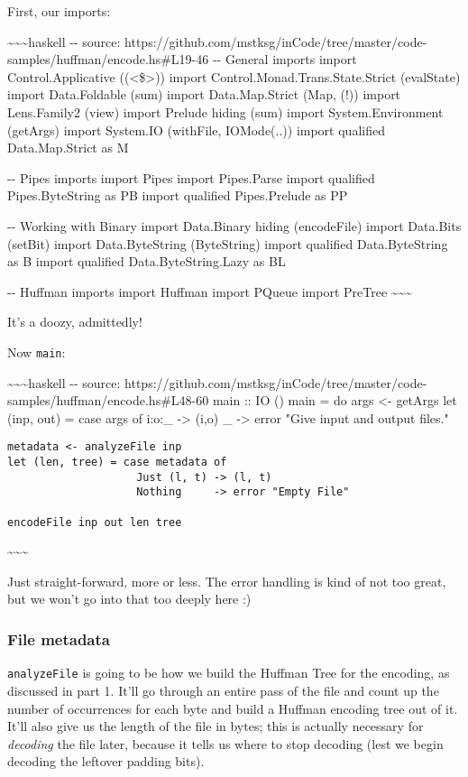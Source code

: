 \documentclass[]{article}
\begin{document}
First, our imports:

\textasciitilde{}\textasciitilde{}\textasciitilde{}haskell -\/- source:
https://github.com/mstksg/inCode/tree/master/code-samples/huffman/encode.hs\#L19-46
-\/- General imports import Control.Applicative ((\textless{}\$\textgreater{}))
import Control.Monad.Trans.State.Strict (evalState) import Data.Foldable (sum)
import Data.Map.Strict (Map, (!)) import Lens.Family2 (view) import Prelude
hiding (sum) import System.Environment (getArgs) import System.IO (withFile,
IOMode(..)) import qualified Data.Map.Strict as M

-\/- Pipes imports import Pipes import Pipes.Parse import qualified
Pipes.ByteString as PB import qualified Pipes.Prelude as PP

-\/- Working with Binary import Data.Binary hiding (encodeFile) import Data.Bits
(setBit) import Data.ByteString (ByteString) import qualified Data.ByteString as
B import qualified Data.ByteString.Lazy as BL

-\/- Huffman imports import Huffman import PQueue import PreTree
\textasciitilde{}\textasciitilde{}\textasciitilde{}

It's a doozy, admittedly!

Now \texttt{main}:

\textasciitilde{}\textasciitilde{}\textasciitilde{}haskell -\/- source:
https://github.com/mstksg/inCode/tree/master/code-samples/huffman/encode.hs\#L48-60
main :: IO () main = do args \textless{}- getArgs let (inp, out) = case args of
i:o:\_ -\textgreater{} (i,o) \_ -\textgreater{} error "Give input and output
files."

\begin{verbatim}
metadata <- analyzeFile inp
let (len, tree) = case metadata of
                    Just (l, t) -> (l, t)
                    Nothing     -> error "Empty File"

encodeFile inp out len tree
\end{verbatim}

\textasciitilde{}\textasciitilde{}\textasciitilde{}

Just straight-forward, more or less. The error handling is kind of not too
great, but we won't go into that too deeply here :)

\subsubsection{File metadata}

\texttt{analyzeFile} is going to be how we build the Huffman Tree for the
encoding, as discussed in part 1. It'll go through an entire pass of the file
and count up the number of occurrences for each byte and build a Huffman
encoding tree out of it. It'll also give us the length of the file in bytes;
this is actually necessary for \emph{decoding} the file later, because it tells
us where to stop decoding (lest we begin decoding the leftover padding bits).
\end{document}
